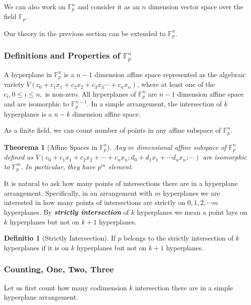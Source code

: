 \documentclass[12pt, a4paper]{article}
\newtheorem{theorem}{Theorema}[subsection]
\theoremstyle{definition}
\newtheorem{definition}{Definitio}[section]
\theoremstyle{remark}
\renewcommand{\emph}[1]{\textit{\textbf{#1}}}
\begin{document}
We can also work on $\mathbb{F}_p^n$ and consider it as an $n$ dimension vector space over the field $\mathbb{F}_p$. 

Our theory in the previous section can be extended to $\mathbb{F}_p^n$.

\subsubsection{Definitions and Properties of $\mathbb{F}_p^n$}

A hyperplane in $\mathbb{F}_p^n$ is a $n-1$ dimension affine space represented as the algebraic variety $V(c_0 + c_1x_1 + c_2x_2 + c_3x_3 \cdots + c_nx_n)$, where at least one of the $c_i, 0 \leq i \leq n,$ is non-zero. 
All hyperplanes of $\mathbb{F}_p^n$ are $n-1$ dimension affine space and are isomorphic to $\mathbb{F}_p^{n-1}$. In a simple arrangement, the intersection of $k$ hyperplanes is a $n-k$ dimension affine space.

As a finite field, we can count number of points in any affine subspace of $\mathbb{F}_p^n$. 

\begin{theorem}[Affine Spaces in $\mathbb{F}_p^n$]
	Any $m$ dimensional affine subspace of $\mathbb{F}_p^n$ defined as $V(c_0 + c_1x_1+c_2x_2 + \cdots + c_nx_n; d_0 + d_1x_1 + \cdots d_nx_n; \cdots)$ are isomorphic to $\mathbb{F}_p^m$. In particular, they have $p^m$ element.
\end{theorem}

It is natural to ask how many points of intersections there are in a hyperplane arrangement. 
Specifically, in an arrangement with $m$ hyperplanes we are interested in how many points of intersections are strictly on $0, 1, 2, \cdots m$ hyperplanes. 
By \emph{strictly intersection} of $k$ hyperplanes we mean a point lays on $k$ hyperplanes but not on $k+1$ hyperplanes. 

\begin{definition}[Strictly Intersection]
	If $p$ belongs to the strictly intersection of $k$ hyperplanes if it is on $k$ hyperplanes but not on $k+1$ hyperplanes.
\end{definition}

\subsubsection{Counting, One, Two, Three}
Let us first count how many codimension $k$ intersection there are in a simple hyperplane arrangement.
\end{document}
